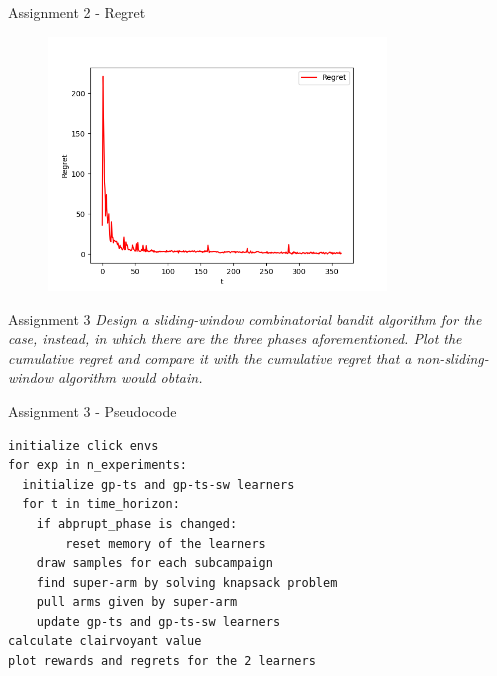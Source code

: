 \documentclass[11pt]{beamer}
\begin{document}
\begin{frame}{Assignment 2 - Regret}
\begin{figure}[hbtp]
\centering
\includegraphics[width=0.8\textwidth]{images/assignment_2_regret.png}
\caption{}
\end{figure}
\end{frame}

\begin{frame}{Assignment 3}
\textit{Design a sliding-window combinatorial bandit algorithm for the case, instead, in which there are the three phases aforementioned. Plot the cumulative regret and compare it with the cumulative regret that a non-sliding-window algorithm would obtain.}
\end{frame}

\begin{frame}[fragile]{Assignment 3 - Pseudocode}
\begin{lstlisting}
initialize click envs
for exp in n_experiments:
  initialize gp-ts and gp-ts-sw learners 
  for t in time_horizon:
  	if abprupt_phase is changed:
  		reset memory of the learners
    draw samples for each subcampaign
    find super-arm by solving knapsack problem
    pull arms given by super-arm
    update gp-ts and gp-ts-sw learners
calculate clairvoyant value
plot rewards and regrets for the 2 learners
\end{lstlisting}
\end{frame}
\end{document}
